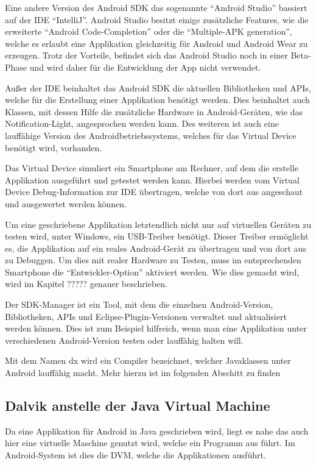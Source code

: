 Eine andere Version des Android \ac{SDK} das sogenannte "`Android Studio"' bassiert auf der \ac{IDE} "`IntelliJ"'. Android Studio besitzt einige zus\"atzliche Features, wie die erweiterte "`Android Code-Completion"' oder die "`Multiple-APK generation"', welche es erlaubt eine Applikation gleichzeitig f\"ur Android und Android Wear zu erzeugen. Trotz der Vorteile, befindet sich das Android Studio noch in einer Beta-Phase und wird daher f\"ur die Entwicklung der App nicht verwendet. \cite{DevAndroidStudio}

Au\ss{}er der \ac{IDE} beinhaltet das Android \ac{SDK} die aktuellen Bibliotheken und APIs, welche f\"ur die Erstellung einer Applikation ben\"otigt werden. Dies beinhaltet auch Klassen, mit dessen Hilfe die zus\"atzliche Hardware in Android-Ger\"aten, wie das Notification-Light, angesprochen werden kann. Des weiteren ist auch eine lauff\"ahige Version des Androidbetriebssystems, welches f\"ur das Virtual Device ben\"otigt wird, vorhanden.

Das Virtual Device simuliert ein Smartphone am Rechner, auf dem die erstelle Applikation ausgef\"uhrt und getestet werden kann. Hierbei werden vom Virtual Device Debug-Information zur \ac{IDE} \"ubertragen, welche von dort aus angeschaut und ausgewertet werden k\"onnen.

Um eine geschriebene Applikation letztendlich nicht nur auf virtuellen Ger\"aten zu testen wird, unter Windows, ein USB-Treiber ben\"otigt. Dieser Treiber erm\"oglicht es, die Applikation auf ein reales Android-Ger\"at zu \"ubertragen und von dort aus zu Debuggen.
Um dies mit realer Hardware zu Testen, muss im entsprechenden Smartphone die "`Entwickler-Option"' aktiviert werden. Wie dies gemacht wird, wird im Kapitel ????? genauer beschrieben.

Der SDK-Manager ist ein Tool, mit dem die einzelnen Android-Version, Bibliotheken, APIs und Eclipse-Plugin-Versionen verwaltet und aktualisiert werden k\"onnen. Dies ist zum Beispiel hilfreich, wenn man eine Applikation unter verschiedenen Android-Version testen oder lauff\"ahig halten will.

Mit dem Namen dx wird ein Compiler bezeichnet, welcher Javaklassen unter Android lauff\"ahig macht. Mehr hierzu ist im folgenden Abschitt zu finden

\subsection{Dalvik anstelle der Java Virtual Machine}
Da eine Applikation f\"ur Android in Java geschrieben wird, liegt es nahe das auch hier eine virtuelle Maschine genutzt wird, welche ein Programm aus f\"uhrt. Im Android-System ist dies die \ac{DVM}, welche die Applikationen ausf\"uhrt.\cite{Android44}

